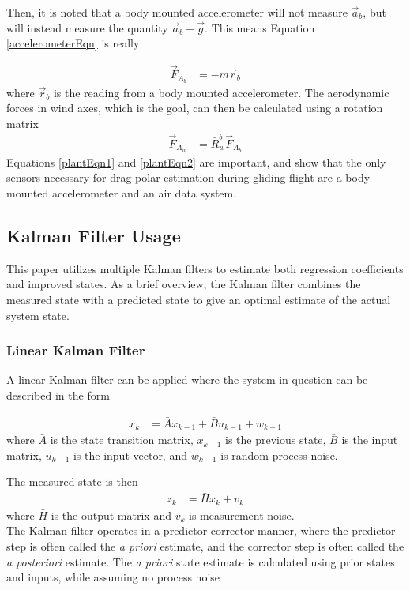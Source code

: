 Then, it is noted that a body mounted accelerometer will not measure $\vec{a}_b$, but will instead measure the quantity $\vec{a}_b - \vec{g}$. This means Equation \ref{accelerometerEqn} is really

\begin{align}
\label{plantEqn1}
\vec{F}_{A_b} &= -m\vec{r}_b
\end{align}
where $\vec{r}_b$ is the reading from a body mounted accelerometer. The aerodynamic forces in wind axes, which is the goal, can then be calculated using a rotation matrix
\begin{align}
\label{plantEqn2}
\vec{F}_{A_w} &= \bar{R}^b_w\vec{F}_{A_b}
\end{align}
Equations \ref{plantEqn1} and \ref{plantEqn2} are important, and show that the only sensors necessary for drag polar estimation during gliding flight are a body-mounted accelerometer and an air data system.

\subsection*{Kalman Filter Usage}
\label{kalman-filter}
This paper utilizes multiple Kalman filters to estimate both regression coefficients and improved states. As a brief overview, the Kalman filter combines the measured state with a predicted state to give an optimal\cite{kalman60} estimate of the actual system state.

\subsubsection*{Linear Kalman Filter}
A linear Kalman filter can be applied\cite{welch1995introduction} where the system in question can be described in the form 

\begin{align}
x_k &= \bar{A}x_{k-1} + \bar{B}u_{k-1}+w_{k-1}
\end{align}
\noindent
where $\bar{A}$ is the state transition matrix, $x_{k-1}$ is the previous state, $\bar{B}$ is the input matrix, $u_{k-1}$ is the input vector, and $w_{k-1}$ is random process noise.

The measured state is then 
\begin{align}
z_k &= \bar{H}x_k+v_k
\end{align} 
\noindent
where $\bar{H}$ is the output matrix and $v_k$ is measurement noise.\\
The Kalman filter operates in a predictor-corrector manner, where the predictor step is often called the \textit{a priori} estimate, and the corrector step is often called the \textit{a posteriori} estimate. The \textit{a priori} state estimate is calculated using prior states and inputs, while assuming no process noise

